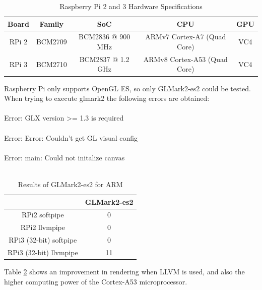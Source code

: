 \documentclass[12pt,a4paper,oneside]{article}
\begin{document}
\begin{table}[h!]
  \begin{center}
    \caption{Raspberry Pi 2 and 3 Hardware Specifications}
    \label{tab:rpi_specs}
    \begin{tabular}{c c c c c }
    Board & Family & SoC & CPU & GPU \\
    \hline
    RPi 2 & BCM2709 & BCM2836 @ 900 MHz & ARMv7 Cortex-A7 (Quad Core) & VC4 \\
    RPi 3 & BCM2710 & BCM2837 @ 1.2 GHz & ARMv8 Cortex-A53 (Quad Core) & VC4 \\
    \end{tabular}
  \end{center}
\end{table}
Raspberry Pi only supports OpenGL ES, so only GLMark2-es2 could be tested. When
trying to execute {\selectfont glmark2} the following errors are
obtained:\\\\
{\selectfont Error: GLX version >= 1.3 is required}\\\\
{\selectfont Error: Error: Couldn't get GL visual config}\\\\
{\selectfont Error: main: Could not initalize canvas}\\\\


\begin{table}[h!]
  \begin{center}
    \caption{Results of GLMark2-es2 for ARM}
    \label{tab:glmark2_ARM}
    \begin{tabular}{c|c}
    & {GLMark2-es2} \\
    \hline
    RPi2 softpipe & 0\\
    RPi2 llvmpipe & 0\\
    RPi3 (32-bit) softpipe & 0\\
    RPi3 (32-bit) llvmpipe & 11\\
    \end{tabular}
  \end{center}
\end{table}
Table \ref{tab:glmark2_ARM} shows an improvement in rendering when LLVM is used,
and also the higher computing power of the Cortex-A53 microprocessor.
\end{document}
